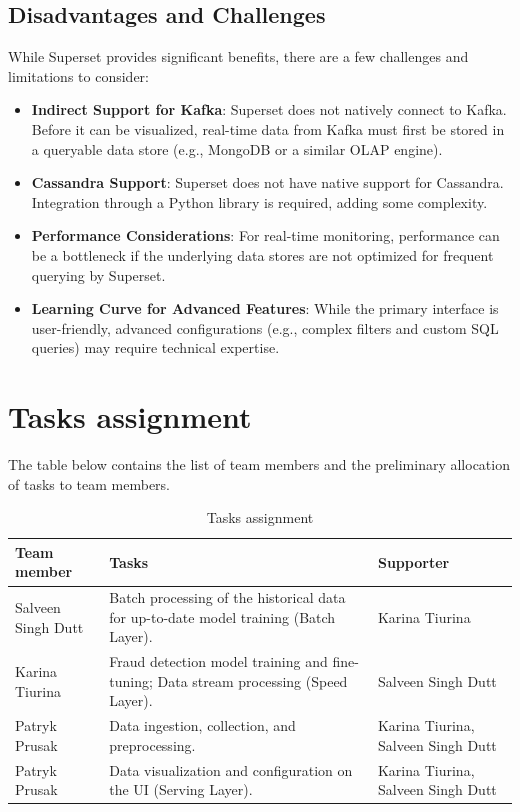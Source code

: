 \documentclass[12pt,a4paper, hidelinks]{article}
\begin{document}
\subsection{Disadvantages and Challenges}
While Superset provides significant benefits, there are a few challenges and limitations to consider:
\begin{itemize}
    \item \textbf{Indirect Support for Kafka}: Superset does not natively connect to Kafka. Before it can be visualized, real-time data from Kafka must first be stored in a queryable data store (e.g., MongoDB or a similar OLAP engine).
    \item \textbf{Cassandra Support}: Superset does not have native support for Cassandra. Integration through a Python library is required, adding some complexity.
    \item \textbf{Performance Considerations}: For real-time monitoring, performance can be a bottleneck if the underlying data stores are not optimized for frequent querying by Superset.
    \item \textbf{Learning Curve for Advanced Features}: While the primary interface is user-friendly, advanced configurations (e.g., complex filters and custom SQL queries) may require technical expertise.
\end{itemize}


\section{Tasks assignment}

The table below contains the list of team members and the preliminary allocation of tasks to team members.

\begin{table}[htbp]
\centering
\begin{tabular}{|p{4cm}|p{6.5cm}|p{4cm}|}
\hline
\textbf{Team member} & \textbf{Tasks} & \textbf{Supporter} \\
\hline
Salveen Singh Dutt & Batch processing of the historical data for up-to-date model training (Batch Layer). & Karina Tiurina \\
\hline
Karina Tiurina & Fraud detection model training and fine-tuning; Data stream processing (Speed Layer). & Salveen Singh Dutt \\
\hline
Patryk Prusak & Data ingestion, collection, and preprocessing. & Karina Tiurina, Salveen Singh Dutt  \\
\hline
Patryk Prusak & Data visualization and configuration on the UI (Serving Layer). & Karina Tiurina, Salveen Singh Dutt \\
\hline
\end{tabular}
\caption{Tasks assignment}
\end{table}
\end{document}
